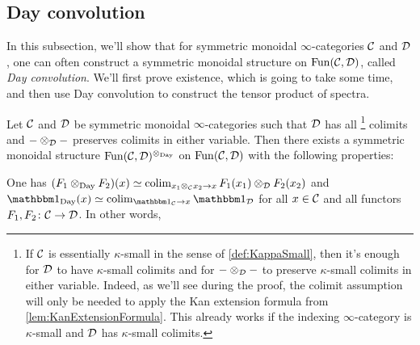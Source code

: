 \subsection{Day convolution}\label{subsec:DayConvolution}
In this subsection, we'll show that for symmetric monoidal $\infty$-categories $\mathcal{C}$ and $\mathcal{D}$, one can often construct a symmetric monoidal structure on $\operatorname{Fun}(\mathcal{C},\mathcal{D})$, called \emph{Day convolution}. We'll first prove existence, which is going to take some time, and then use Day convolution to construct the tensor product of spectra.

\begin{thm}\label{thm:DayConvolution}
	Let $\mathcal{C}$ and $\mathcal{D}$ be symmetric monoidal $\infty$-categories such that $\mathcal{D}$ has all%
	\footnote{If $\mathcal{C}$ is essentially $\kappa$-small in the sense of \cref{def:KappaSmall}, then it's enough for $\mathcal{D}$ to have $\kappa$-small colimits and for $-\otimes_{\mathcal{D}}-$ to preserve $\kappa$-small colimits in either variable. Indeed, as we'll see during the proof, the colimit assumption will only be needed to apply the Kan extension formula from \cref{lem:KanExtensionFormula}. This already works if the indexing $\infty$-category is $\kappa$-small and $\mathcal{D}$ has $\kappa$-small colimits.}
	colimits and $-\otimes_{\mathcal{D}} -$ preserves colimits in either variable. Then there exists a symmetric monoidal structure $\operatorname{Fun}(\mathcal{C},\mathcal{D})^{\otimes_\mathrm{Day}}$ on $\operatorname{Fun}(\mathcal{C},\mathcal{D})$ with the following properties:
	\begin{alphanumerate}
		\item One has $(F_1\otimes_{\mathrm{Day}}F_2)(x)\simeq \operatorname*{colim}_{x_1\otimes_{\mathcal{C}} x_2\rightarrow x}F_1(x_1)\otimes_{\mathcal{D}} F_2(x_2)$ and $\IUnit_{\mathrm{Day}}(x)\simeq \colimit_{\IUnit_\Cc\rightarrow x}\IUnit_\Dd$ for all $x\in \mathcal{C}$ and all functors $F_1,F_2\colon \mathcal{C}\rightarrow \mathcal{D}$. In other words,
		\begin{equation*}

\end{equation*}
\end{alphanumerate}
\end{thm}
